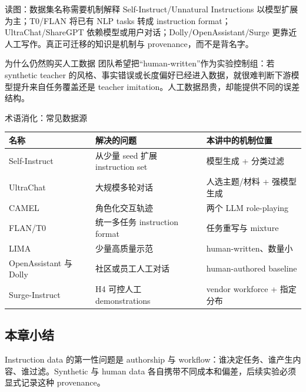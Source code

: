 \begin{knowledgebox}{读图：数据集名称需要机制解释}
Self-Instruct/Unnatural Instructions 以模型扩展为主；T0/FLAN 将已有 NLP tasks 转成 instruction format；UltraChat/ShareGPT 依赖模型或用户对话；Dolly/OpenAssistant/Surge 更靠近人工写作。真正可迁移的知识是机制与 provenance，而不是背名字。
\end{knowledgebox}


\begin{importantbox}{为什么仍然购买人工数据}
团队希望把“human-written”作为实验控制组：若 synthetic teacher 的风格、事实错误或长度偏好已经进入数据，就很难判断下游模型提升来自任务覆盖还是 teacher imitation。人工数据昂贵，却能提供不同的误差结构。
\end{importantbox}


\begin{knowledgebox}{术语消化：常见数据源}
\begin{tabularx}{\textwidth}{@{}L{0.18\textwidth}L{0.25\textwidth}X@{}}
\toprule
名称 & 解决的问题 & 本讲中的机制位置 \\
\midrule
Self-Instruct & 从少量 seed 扩展 instruction set & 模型生成 + 分类过滤 \\
UltraChat & 大规模多轮对话 & 人选主题/材料 + 强模型生成 \\
CAMEL & 角色化交互轨迹 & 两个 LLM role-playing \\
FLAN/T0 & 统一多任务 instruction format & 任务重写与 mixture \\
LIMA & 少量高质量示范 & human-written、数量小 \\
OpenAssistant 与 Dolly & 社区或员工人工对话 & human-authored baseline \\
Surge-Instruct & H4 可控人工 demonstrations & vendor workforce + 指定分布 \\
\bottomrule
\end{tabularx}
\end{knowledgebox}

\subsection{本章小结}

Instruction data 的第一性问题是 authorship 与 workflow：谁决定任务、谁产生内容、谁过滤。Synthetic 与 human data 各自携带不同成本和偏差，后续实验必须显式记录这种 provenance。


